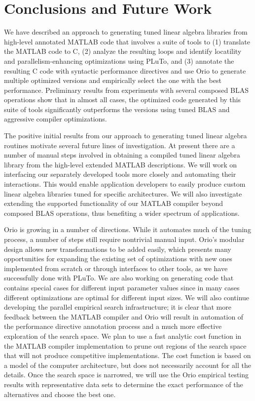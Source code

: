 \documentclass[runningheads]{llncs}
\begin{document}
\section{Conclusions and Future Work}

We have described an approach to generating tuned linear algebra libraries from high-level annotated MATLAB code that involves a suite of tools to (1) translate the MATLAB code to C, (2) analyze the resulting loops and identify locatility and parallelism-enhancing optimizations using PLuTo, and (3) annotate the resulting C code with syntactic performance directives and use Orio to generate multiple optimized versions and empirically select the one with the best performance. Preliminary results from experiments with several composed BLAS operations show that in almost all cases, the optimized code generated by this suite of tools significantly outperforms the versions using tuned BLAS and aggressive compiler optimizations.

The positive initial results from our approach to generating tuned linear algebra routines motivate several future lines of investigation. At present there are a number of manual steps involved in obtaining a compiled tuned linear algebra library from the high-level extended MATLAB descriptions. We will work on interfacing our separately developed tools more closely and automating their interactions. This would enable application developers to easily produce custom linear algebra libraries tuned for specific architectures. We will also investigate extending the supported functionality of our MATLAB compiler beyond composed BLAS operations, thus benefiting a wider spectrum of applications.

Orio is growing in a number of directions. While it automates much of the tuning process, a number of steps still require nontrivial manual input. Orio's modular design allows new transformations to be added easily, which presents many opportunities for expanding the existing set of optimizations with new ones implemented from scratch or through interfaces to other tools, as we have successfully done with PLuTo. We are also working on generating code that contains special cases for different input parameter values since in many cases different optimizations are optimal for different input sizes.  We will also continue developing the parallel empirical search infrastructure; it is clear that more feedback between the MATLAB compiler and Orio will result in automation of the performance directive annotation process and a much more effective exploration of the search space. We plan to use a fast analytic cost function in the MATLAB compiler implementation to prune out regions of the search space that will not produce competitive implementations. The cost function is based on a model of the computer architecture, but does not necessarily account for all the details. Once the search space is narrowed, we will use the Orio empirical testing results with representative data sets to determine the exact performance of the alternatives and choose the best one.
\end{document}

